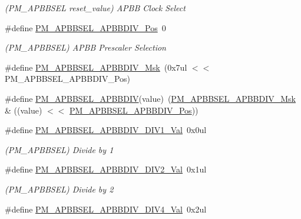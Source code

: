 \begin{DoxyCompactItemize}
\begin{DoxyCompactList}\small\item\em (P\+M\+\_\+\+A\+P\+B\+B\+S\+EL reset\+\_\+value) A\+P\+BB Clock Select \end{DoxyCompactList}\item 
\#define \mbox{\hyperlink{group___s_a_m_d21___p_m_ga96e9f272a436f893bd20fbdf05644b79}{P\+M\+\_\+\+A\+P\+B\+B\+S\+E\+L\+\_\+\+A\+P\+B\+B\+D\+I\+V\+\_\+\+Pos}}~0
\begin{DoxyCompactList}\small\item\em (P\+M\+\_\+\+A\+P\+B\+B\+S\+EL) A\+P\+BB Prescaler Selection \end{DoxyCompactList}\item 
\#define \mbox{\hyperlink{group___s_a_m_d21___p_m_gad86d78219d8c53bfaabd7cd2d76b77be}{P\+M\+\_\+\+A\+P\+B\+B\+S\+E\+L\+\_\+\+A\+P\+B\+B\+D\+I\+V\+\_\+\+Msk}}~(0x7ul $<$$<$ P\+M\+\_\+\+A\+P\+B\+B\+S\+E\+L\+\_\+\+A\+P\+B\+B\+D\+I\+V\+\_\+\+Pos)
\item 
\#define \mbox{\hyperlink{group___s_a_m_d21___p_m_gae07bd162141ba68f6fffa15f2444a27f}{P\+M\+\_\+\+A\+P\+B\+B\+S\+E\+L\+\_\+\+A\+P\+B\+B\+D\+IV}}(value)~(\mbox{\hyperlink{group___s_a_m_d21___p_m_gad86d78219d8c53bfaabd7cd2d76b77be}{P\+M\+\_\+\+A\+P\+B\+B\+S\+E\+L\+\_\+\+A\+P\+B\+B\+D\+I\+V\+\_\+\+Msk}} \& ((value) $<$$<$ \mbox{\hyperlink{group___s_a_m_d21___p_m_ga96e9f272a436f893bd20fbdf05644b79}{P\+M\+\_\+\+A\+P\+B\+B\+S\+E\+L\+\_\+\+A\+P\+B\+B\+D\+I\+V\+\_\+\+Pos}}))
\item 
\#define \mbox{\hyperlink{group___s_a_m_d21___p_m_gabbcc76aa37209416de7d817aba658aa7}{P\+M\+\_\+\+A\+P\+B\+B\+S\+E\+L\+\_\+\+A\+P\+B\+B\+D\+I\+V\+\_\+\+D\+I\+V1\+\_\+\+Val}}~0x0ul
\begin{DoxyCompactList}\small\item\em (P\+M\+\_\+\+A\+P\+B\+B\+S\+EL) Divide by 1 \end{DoxyCompactList}\item 
\#define \mbox{\hyperlink{group___s_a_m_d21___p_m_ga2c50db39cb50f6e832f931895278dccd}{P\+M\+\_\+\+A\+P\+B\+B\+S\+E\+L\+\_\+\+A\+P\+B\+B\+D\+I\+V\+\_\+\+D\+I\+V2\+\_\+\+Val}}~0x1ul
\begin{DoxyCompactList}\small\item\em (P\+M\+\_\+\+A\+P\+B\+B\+S\+EL) Divide by 2 \end{DoxyCompactList}\item 
\#define \mbox{\hyperlink{group___s_a_m_d21___p_m_gae5b3508dcee9ffb736f58d0d4457ef7a}{P\+M\+\_\+\+A\+P\+B\+B\+S\+E\+L\+\_\+\+A\+P\+B\+B\+D\+I\+V\+\_\+\+D\+I\+V4\+\_\+\+Val}}~0x2ul

\end{DoxyCompactItemize}
